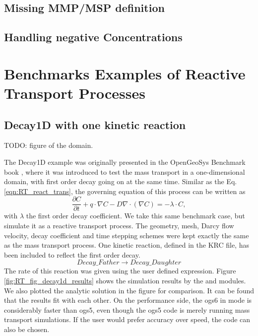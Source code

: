\subsection{Missing MMP/MSP definition}

\subsection{Handling negative Concentrations}



\section{Benchmarks Examples of Reactive Transport Processes}
\label{sec:benchmarks}
\subsection{Decay1D with one kinetic reaction}

TODO: figure of the domain. 

The Decay1D example was originally presented in the OpenGeoSys Benchmark book \cite{DBB2012}, where it was introduced to test the mass transport in a one-dimensional domain, with first order decay going on at the same time. Similar as the Eq. \ref{eqn:RT_react_trans}, the governing equation of this process can be written as
\begin{equation}
\frac{\partial C}{\partial t} + q \cdot \nabla C - D \nabla \cdot \left( \nabla C \right) = - \lambda \cdot C , 
\end{equation}
with $\lambda$ the first order decay coefficient. We take this same benchmark case, but simulate it as a reactive transport process. The geometry, mesh, Darcy flow velocity, decay coefficient and time stepping schemes were kept exactly the same as the mass transport process. One kinetic reaction, defined in the KRC file, has been included to reflect the first order decay. 
$$
Decay\_Father \rightarrow Decay\_Daughter
$$
The rate of this reaction was given using the user defined expression. Figure \ref{fig:RT_fig_decay1d_results} shows the simulation results by the  and  modules. We also plotted the analytic solution in the figure for comparison. It can be found that the results fit with each other. On the performance side, the ogs6 in  mode is considerably faster than ogs5, even though the ogs5 code is merely running mass transport simulations. If the user would prefer accuracy over speed, the  code can also be chosen. 

